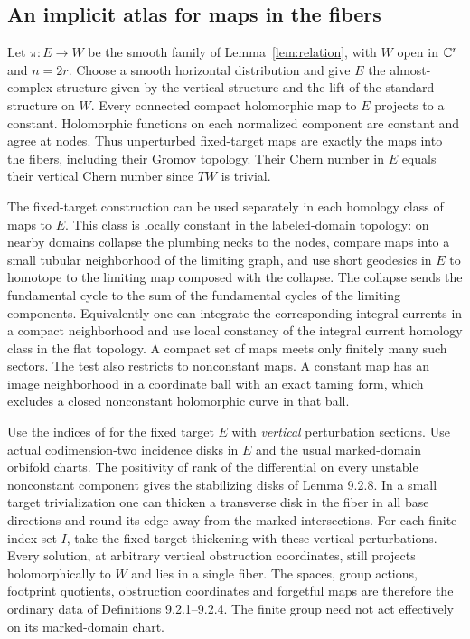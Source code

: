 \subsection{An implicit atlas for maps in the fibers}
Let $\pi:E\to W$ be the smooth family of Lemma~\ref{lem:relation},
with $W$ open in $\mathbb C^r$ and $n=2r$. Choose a smooth horizontal distribution
and give $E$ the almost-complex structure given by the vertical
structure and the lift of the standard structure on $W$.
Every connected compact holomorphic map to $E$ projects to a
constant. Holomorphic functions on each normalized component are
constant and agree at nodes. Thus unperturbed fixed-target maps
are exactly the maps into the fibers, including their Gromov
topology. Their Chern number in $E$ equals their vertical Chern
number since $TW$ is trivial.

The fixed-target construction can be used separately in each
homology class of maps to $E$. This class is locally constant in
the labeled-domain topology: on nearby domains collapse the
plumbing necks to the nodes, compare maps into a small tubular
neighborhood of the limiting graph, and use short geodesics in
$E$ to homotope to the limiting map composed with the collapse.
The collapse sends the fundamental cycle to the sum of the
fundamental cycles of the limiting components. Equivalently one
can integrate the corresponding integral currents in a compact
neighborhood and use local constancy of the integral current
homology class in the flat topology. A compact set of maps meets
only finitely many such sectors. The test also restricts to
nonconstant maps. A constant map has an image neighborhood
in a coordinate ball with an exact taming form, which excludes a closed
nonconstant holomorphic curve in that ball.

Use the indices of \cite[\S9.2]{Atlas} for the fixed target $E$ with \emph{vertical}
perturbation sections. Use actual codimension-two incidence disks
in $E$ and the usual marked-domain orbifold charts. The positivity
of rank of the differential on every unstable nonconstant component
gives the stabilizing disks of Lemma 9.2.8. In a small target
trivialization one can thicken a transverse disk in the fiber in
all base directions and round its edge away from the marked
intersections. For each finite index set $I$, take the fixed-target
thickening with these vertical perturbations. Every solution, at
arbitrary vertical obstruction coordinates, still projects
holomorphically to $W$ and lies in a single fiber. The spaces, group
actions, footprint quotients, obstruction coordinates and forgetful
maps are therefore the ordinary data of Definitions 9.2.1--9.2.4.
The finite group need not act effectively on its marked-domain chart.

